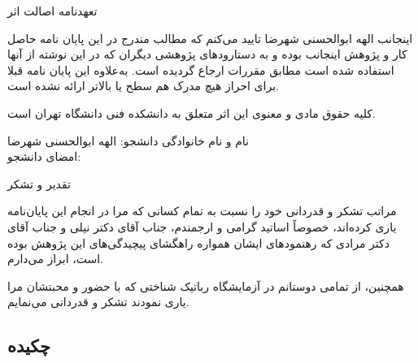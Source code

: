 \documentclass[twoside, a4paper,11pt]{book}
\numberwithin{equation}{chapter}
\numberwithin{table}{chapter}
\numberwithin{figure}{chapter}
\numberwithin{equation}{chapter}
\begin{document}
\newpage
\thispagestyle{empty}
\mbox{}

\newpage
\thispagestyle{empty}
{ \LARGE 
\begin{center}
تعهدنامه اصالت اثر
\end{center}}
اینجانب الهه ابوالحسنی شهرضا تایید می‌کنم که مطالب مندرج در این پایان نامه حاصل کار و پژوهش اینجانب بوده و به دستارود‌های پژوهشی دیگران که در این نوشته از آنها استفاده شده است مطابق مقررات ارجاع گردیده است. به‌علاوه این پایان نامه قبلا برای احراز هیچ مدرک هم سطح یا بالاتر ارائه نشده است.
\par
کلیه حقوق مادی و معنوی این اثر متعلق به دانشکده فنی دانشگاه تهران است.
\par 
\vskip 2cm


\begin{flushleft}
نام و نام خانوادگی دانشجو: الهه ابوالحسنی شهرضا \hspace{1.75cm}~~~~~~~ \\
امضای دانشجو: ~~~~~~~~~~~~~~~~~~~~~~~~~~~~~~~~~~~~~~~~~~~~~~~~~~~~~
\end{flushleft}

\newpage
\thispagestyle{empty}
\mbox{}




\newpage
\thispagestyle{empty}
\mbox{}


\newpage
\thispagestyle{empty}
{\nastaliqbig \Huge 
تقدیر و تشکر\nastaliq

{\par\vspace{1cm}}
\LARGE
\begin{adjustwidth}{1cm}{}
مراتب تشکر و قدردانی خود را نسبت به تمام کسانی که مرا در انجام این پایان‌نامه یاری کرده‌اند، خصوصاً اساتید گرامی و ارجمندم، جناب آقای دکتر نیلی و جناب آقای دکتر مرادی که رهنمودهای ایشان همواره راهگشای پیچیدگی‌های این پژوهش بوده است، ابراز می‌دارم. 

همچنین، از تمامی دوستانم در آزمایشگاه رباتیک شناختی که با حضور و محبتشان مرا یاری نمودند تشکر و قدردانی می‌نمایم. 

\end{adjustwidth}
}


\newpage
\thispagestyle{empty}
\mbox{}


\pagestyle{plain}

\newpage

\begin{center}
\vspace*{-2.6cm}
\subsection*{چکیده}
\end{center}
\vspace*{-.4cm}
\end{document}
